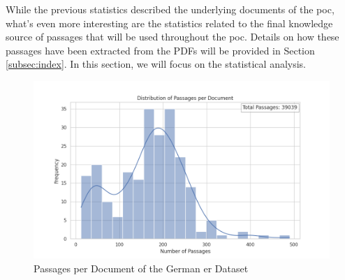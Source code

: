 While the previous statistics described the underlying documents of the \gls{poc}, what's even more interesting are the statistics related to the final knowledge source of passages that will be used throughout the \gls{poc}. Details on how these passages have been extracted from the PDFs will be provided in Section \ref{subsec:index}. In this section, we will focus on the statistical analysis.

\begin{figure}
    \centering
    \includegraphics[width=\textwidth]{Grafiken/Statistiken/IndexGerman_Passages_Distribution.png}
    \caption{Passages per Document of the German \gls{er} Dataset}
    \label{fig:er-german-passage-document}
\end{figure}

